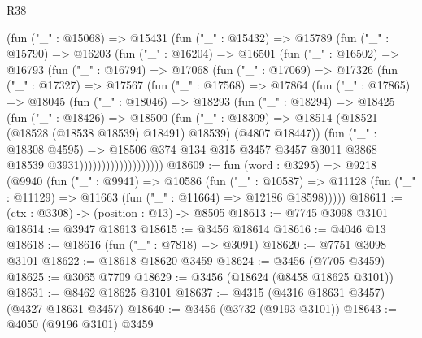 \begin{lexlean}{R38}
\begin{coremodule}
              (fun ("_" : @15068) =>
              @15431
                (fun ("_" : @15432) =>
                @15789
                  (fun ("_" : @15790) =>
                  @16203
                    (fun ("_" : @16204) =>
                    @16501
                      (fun ("_" : @16502) =>
                      @16793
                        (fun ("_" : @16794) =>
                        @17068
                          (fun ("_" : @17069) =>
                          @17326
                            (fun ("_" : @17327) =>
                            @17567
                              (fun ("_" : @17568) =>
                              @17864
                                (fun ("_" : @17865) =>
                                @18045
                                  (fun ("_" : @18046) =>
                                  @18293
                                    (fun ("_" : @18294) =>
                                    @18425
                                      (fun ("_" : @18426) =>
                                      @18500
                                        (fun ("_" : @18309) =>
                                        @18514
                                          (@18521 (@18528 (@18538 @18539) @18491) @18539)
                                          (@4807 @18447))
                                        (fun ("_" : @18308 @4595) =>
                                        @18506
                                          @374
                                          @134
                                          @315
                                          @3457
                                          @3457
                                          @3011
                                          @3868
                                          @18539
                                          @3931)))))))))))))))))))
@18609 := fun (word : @3295) =>
  @9218
    (@9940
      (fun ("_" : @9941) =>
      @10586
        (fun ("_" : @10587) =>
        @11128 (fun ("_" : @11129) => @11663 (fun ("_" : @11664) => @12186 @18598)))))
@18611 := (ctx : @3308) -> (position : @13) -> @8505
@18613 := @7745 @3098 @3101
@18614 := @3947 @18613
@18615 := @3456 @18614
@18616 := @4046 @13
@18618 := @18616 (fun ("_" : @7818) => @3091)
@18620 := @7751 @3098 @3101
@18622 := @18618 @18620 @3459
@18624 := @3456 (@7705 @3459)
@18625 := @3065 @7709
@18629 := @3456 (@18624 (@8458 @18625 @3101))
@18631 := @8462 @18625 @3101
@18637 := @4315 (@4316 @18631 @3457) (@4327 @18631 @3457)
@18640 := @3456 (@3732 (@9193 @3101))
@18643 := @4050 (@9196 @3101) @3459

\end{coremodule}
\end{lexlean}
